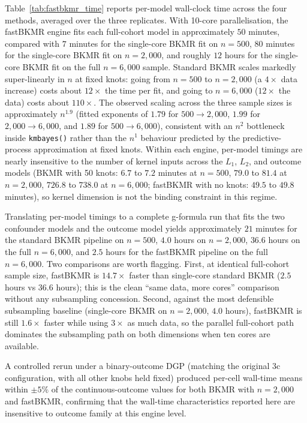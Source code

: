 \documentclass[11pt]{article}
\newcommand{\code}[1]{\texttt{#1}}
\begin{document}
Table~\ref{tab:fastbkmr_time} reports per-model wall-clock time across the four methods, averaged over the three replicates. With 10-core parallelisation, the fastBKMR engine fits each full-cohort model in approximately $50$ minutes, compared with $7$ minutes for the single-core BKMR fit on $n = 500$, $80$ minutes for the single-core BKMR fit on $n = 2{,}000$, and roughly $12$ hours for the single-core BKMR fit on the full $n = 6{,}000$ sample. Standard BKMR scales markedly super-linearly in $n$ at fixed knots: going from $n = 500$ to $n = 2{,}000$ (a $4\times$ data increase) costs about $12\times$ the time per fit, and going to $n = 6{,}000$ ($12\times$ the data) costs about $110\times$. The observed scaling across the three sample sizes is approximately $n^{1.9}$ (fitted exponents of $1.79$ for $500 \to 2{,}000$, $1.99$ for $2{,}000 \to 6{,}000$, and $1.89$ for $500 \to 6{,}000$), consistent with an $n^2$ bottleneck inside \code{kmbayes()} rather than the $n^1$ behaviour predicted by the predictive-process approximation at fixed knots. Within each engine, per-model timings are nearly insensitive to the number of kernel inputs across the $L_1$, $L_2$, and outcome models (BKMR with 50 knots: $6.7$ to $7.2$ minutes at $n = 500$, $79.0$ to $81.4$ at $n = 2{,}000$, $726.8$ to $738.0$ at $n = 6{,}000$; fastBKMR with no knots: $49.5$ to $49.8$ minutes), so kernel dimension is not the binding constraint in this regime.

Translating per-model timings to a complete g-formula run that fits the two confounder models and the outcome model yields approximately $21$ minutes for the standard BKMR pipeline on $n = 500$, $4.0$ hours on $n = 2{,}000$, $36.6$ hours on the full $n = 6{,}000$, and $2.5$ hours for the fastBKMR pipeline on the full $n = 6{,}000$. Two comparisons are worth flagging. First, at identical full-cohort sample size, fastBKMR is $14.7\times$ faster than single-core standard BKMR ($2.5$ hours vs $36.6$ hours); this is the clean ``same data, more cores'' comparison without any subsampling concession. Second, against the most defensible subsampling baseline (single-core BKMR on $n = 2{,}000$, $4.0$ hours), fastBKMR is still $1.6\times$ faster while using $3\times$ as much data, so the parallel full-cohort path dominates the subsampling path on both dimensions when ten cores are available.

A controlled rerun under a binary-outcome DGP (matching the original 3c configuration, with all other knobs held fixed) produced per-cell wall-time means within $\pm 5\%$ of the continuous-outcome values for both BKMR with $n = 2{,}000$ and fastBKMR, confirming that the wall-time characteristics reported here are insensitive to outcome family at this engine level.
\end{document}
